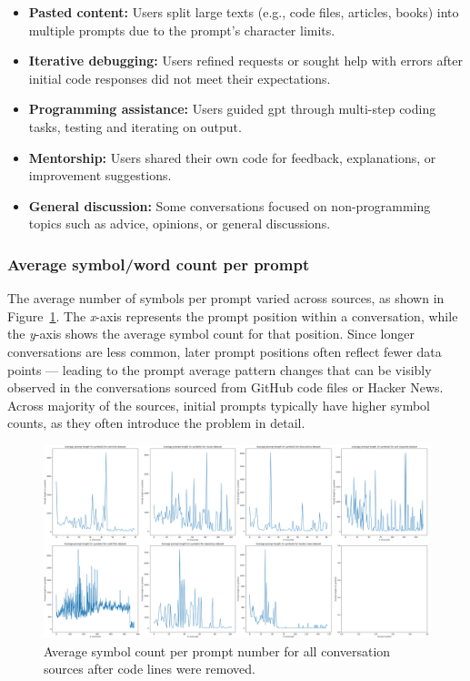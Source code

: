 \begin{itemize}
    \item \textbf{Pasted content:} Users split large texts (e.g., code files, articles, books) into multiple prompts due to the prompt's character limits.
    \item \textbf{Iterative debugging:} Users refined requests or sought help with errors after initial code responses did not meet their expectations.
    \item \textbf{Programming assistance:} Users guided \acrshort{gpt} through multi-step coding tasks, testing and iterating on output.
    \item \textbf{Mentorship:} Users shared their own code for feedback, explanations, or improvement suggestions.
    \item \textbf{General discussion:} Some conversations focused on non-programming topics such as advice, opinions, or general discussions.
\end{itemize}

\subsubsection{Average symbol/word count per prompt}
The average number of symbols per prompt varied across sources, as shown in Figure~\ref{fig:symbols-per-prompt}. The \textit{x}-axis represents the prompt position within a conversation, while the \textit{y}-axis shows the average symbol count for that position. Since longer conversations are less common, later prompt positions often reflect fewer data points --- leading to the prompt average pattern changes that can be visibly observed in the conversations sourced from GitHub code files or Hacker News. Across majority of the sources, initial prompts typically have higher symbol counts, as they often introduce the problem in detail.

\begin{figure}[H]
    \centering
    \includegraphics[width=\textwidth]{imgs/symbols-per-prompt.png}
    \caption{Average symbol count per prompt number for all conversation sources after code lines were removed.}
    \label{fig:symbols-per-prompt}
\end{figure}

